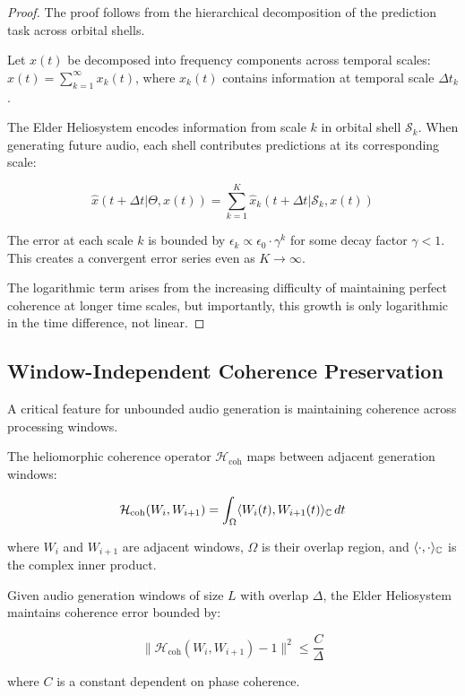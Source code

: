 \begin{proof}
The proof follows from the hierarchical decomposition of the prediction task across orbital shells.

Let $x(t)$ be decomposed into frequency components across temporal scales: $x(t) = \sum_{k=1}^{\infty} x_k(t)$, where $x_k(t)$ contains information at temporal scale $\Delta t_k$.

The Elder Heliosystem encodes information from scale $k$ in orbital shell $\mathcal{S}_k$. When generating future audio, each shell contributes predictions at its corresponding scale:

\begin{equation}
\hat{x}(t+\Delta t|\Theta, x(t)) = \sum_{k=1}^K \hat{x}_k(t+\Delta t|\mathcal{S}_k, x(t))
\end{equation}

The error at each scale $k$ is bounded by $\epsilon_k \propto \epsilon_0 \cdot \gamma^k$ for some decay factor $\gamma < 1$. This creates a convergent error series even as $K \rightarrow \infty$.

The logarithmic term arises from the increasing difficulty of maintaining perfect coherence at longer time scales, but importantly, this growth is only logarithmic in the time difference, not linear.
\end{proof}

\subsection{Window-Independent Coherence Preservation}

A critical feature for unbounded audio generation is maintaining coherence across processing windows.

\begin{definition}
The heliomorphic coherence operator $\mathcal{H}_{\text{coh}}$ maps between adjacent generation windows:

\begin{equation}
\mathcal{H}_{\text{coh}}(W_i, W_{i+1}) = \int_{\Omega} \langle W_i(t), W_{i+1}(t) \rangle_{\mathbb{C}} \, dt
\end{equation}

where $W_i$ and $W_{i+1}$ are adjacent windows, $\Omega$ is their overlap region, and $\langle \cdot, \cdot \rangle_{\mathbb{C}}$ is the complex inner product.
\end{definition}

\begin{theorem}
Given audio generation windows of size $L$ with overlap $\Delta$, the Elder Heliosystem maintains coherence error bounded by:

\begin{equation}
\|\mathcal{H}_{\text{coh}}(W_i, W_{i+1}) - 1\|^2 \leq \frac{C}{\Delta}
\end{equation}

where $C$ is a constant dependent on phase coherence.
\end{theorem}


